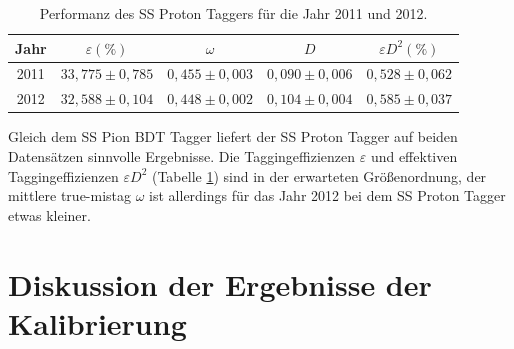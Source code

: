 \begin{table}[htbp]
	\centering
	\caption{Performanz des SS Proton Taggers für die Jahr \num{2011} und \num{2012}.}
	\label{tab:performance_SSProton}
	\begin{tabular}{ccccc}
	\toprule
       Jahr & $\varepsilon(\%)$ & $\omega$ & $D$ & $\varepsilon D^2(\%)$ \\ 
       \midrule
   2011 & $33{,}775\pm0{,}785$& $0{,}455\pm0{,}003$ & $0{,}090\pm0{,}006$ & $0{,}528\pm0{,}062$\\ 
   2012 & $32{,}588\pm0{,}104$& $0{,}448\pm0{,}002$ & $0{,}104\pm0{,}004$ & $0{,}585\pm0{,}037$\\ 
   \bottomrule
	\end{tabular}
\end{table}
Gleich dem SS Pion BDT Tagger liefert der SS Proton Tagger auf beiden Datensätzen sinnvolle Ergebnisse. Die Taggingeffizienzen $\varepsilon$ und effektiven Taggingeffizienzen $\varepsilon D^2$ (Tabelle \ref{tab:performance_SSProton}) sind in der erwarteten Größenordnung, der mittlere true-mistag $\omega$ ist allerdings für das Jahr \num{2012} bei dem SS Proton Tagger etwas kleiner.

\section{Diskussion der Ergebnisse der Kalibrierung}

